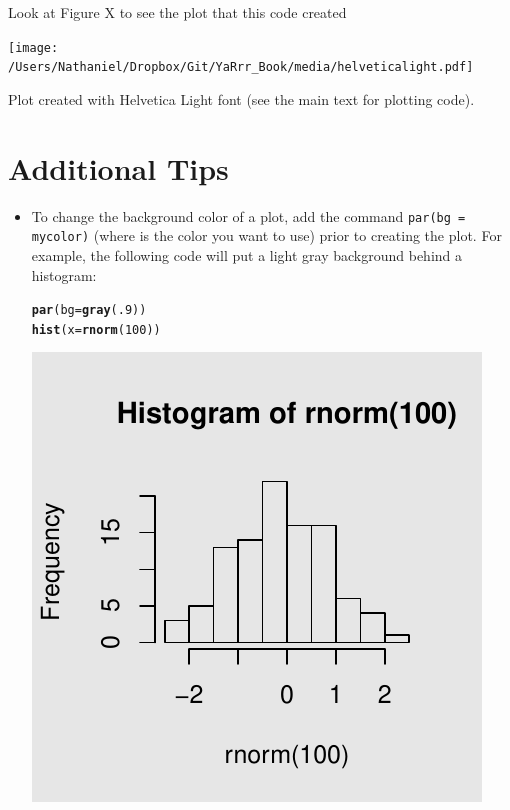 \documentclass{tufte-book}\usepackage[]{graphicx}\usepackage[]{color}
\makeatletter
\def\maxwidth{ %
  \ifdim\Gin@nat@width>\linewidth
    \linewidth
  \else
    \Gin@nat@width
  \fi
}
\newcommand{\hlnum}[1]{\textcolor[rgb]{0.686,0.059,0.569}{#1}}%
\newcommand{\hlstd}[1]{\textcolor[rgb]{0.345,0.345,0.345}{#1}}%
\newcommand{\hlkwc}[1]{\textcolor[rgb]{0.333,0.667,0.333}{#1}}%
\newcommand{\hlkwd}[1]{\textcolor[rgb]{0.737,0.353,0.396}{\textbf{#1}}}%
\newenvironment{kframe}{%
 \def\at@end@of@kframe{}%
 \ifinner\ifhmode%
  \def\at@end@of@kframe{\end{minipage}}%
  \begin{minipage}{\columnwidth}%
 \fi\fi%
 \def\FrameCommand##1{\hskip\@totalleftmargin \hskip-\fboxsep
 \colorbox{shadecolor}{##1}\hskip-\fboxsep
     \hskip-\linewidth \hskip-\@totalleftmargin \hskip\columnwidth}%
 \MakeFramed {\advance\hsize-\width
   \@totalleftmargin\z@ \linewidth\hsize
   \@setminipage}}%
 {\par\unskip\endMakeFramed%
 \at@end@of@kframe}
\newenvironment{knitrout}{}{} %
\makeatother
\begin{document}
\begin{footnotesize}
Look at Figure X to see the plot that this code created

\begin{marginfigure}
\texttt{[image: /Users/Nathaniel/Dropbox/Git/YaRrr\_Book/media/helveticalight.pdf]}
\caption{Plot created with Helvetica Light font (see the main text for plotting code).}
\label{fig:helvetica}
\end{marginfigure}


\pagebreak
\section{Additional Tips}

\begin{itemize}


  \item To change the background color of a plot, add the command \texttt{par(bg = mycolor)} (where  is the color you want to use) prior to creating the plot. For example, the following code will put a light gray background behind a histogram:
  
\begin{knitrout}
\color{fgcolor}\begin{kframe}
\begin{alltt}
\hlkwd{par}\hlstd{(}\hlkwc{bg} \hlstd{=} \hlkwd{gray}\hlstd{(}\hlnum{.9}\hlstd{))}
\hlkwd{hist}\hlstd{(}\hlkwc{x} \hlstd{=} \hlkwd{rnorm}\hlstd{(}\hlnum{100}\hlstd{))}
\end{alltt}
\end{kframe}
\includegraphics[width=\maxwidth]{figure/unnamed-chunk-196-1} 


\end{knitrout}
\end{itemize}
\end{footnotesize}
\end{document}
